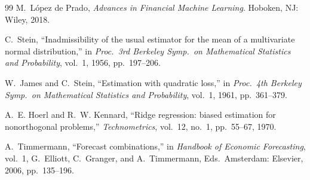 \documentclass[10pt,twocolumn,twoside]{eec_style}
\begin{document}
\begin{thebibliography}{99}
 M.~L\'opez de Prado, \emph{Advances in Financial Machine
Learning}. Hoboken, NJ: Wiley, 2018.

 C.~Stein, ``Inadmissibility of the usual estimator for the mean of
a multivariate normal distribution,'' in \emph{Proc.\ 3rd Berkeley Symp.\ on
Mathematical Statistics and Probability}, vol.\ 1, 1956, pp.\ 197--206.

 W.~James and C.~Stein, ``Estimation with quadratic loss,'' in
\emph{Proc.\ 4th Berkeley Symp.\ on Mathematical Statistics and Probability}, vol.\ 1,
1961, pp.\ 361--379.

 A.~E. Hoerl and R.~W. Kennard, ``Ridge regression: biased
estimation for nonorthogonal problems,'' \emph{Technometrics}, vol.\ 12, no.\ 1,
pp.\ 55--67, 1970.

 A.~Timmermann, ``Forecast combinations,'' in \emph{Handbook of
Economic Forecasting}, vol.\ 1, G.~Elliott, C.~Granger, and A.~Timmermann, Eds.\
Amsterdam: Elsevier, 2006, pp.\ 135--196.

\end{thebibliography}
\end{document}
